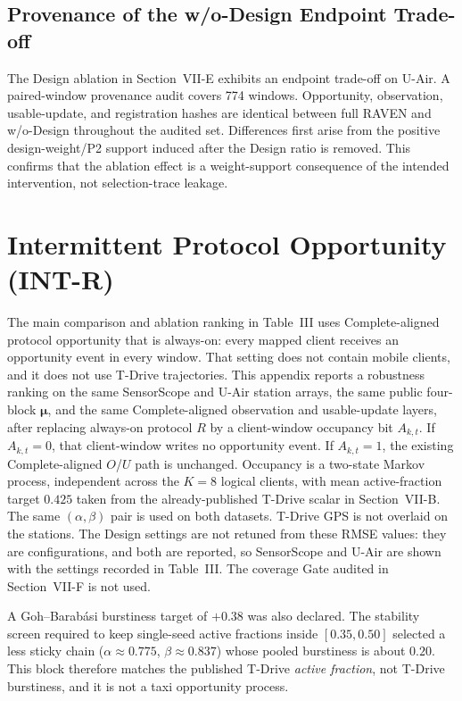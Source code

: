 \subsection{Provenance of the w/o-Design Endpoint Trade-off}
\label{app:design_provenance}

The Design ablation in Section~\mbox {VII-E} exhibits an endpoint
trade-off on U-Air.  A paired-window provenance audit covers
774 windows.  Opportunity, observation, usable-update, and
registration hashes are identical between full RAVEN and w/o-Design throughout
the audited set.  Differences first arise from the positive design-weight/P2
support induced after the Design ratio is removed.  This confirms that the
ablation effect is a weight-support consequence of the intended intervention,
not selection-trace leakage.

\section{Intermittent Protocol Opportunity (INT-R)}
\label{app:int_r}

The main comparison and ablation ranking in Table~III uses
Complete-aligned protocol opportunity that is always-on: every mapped
client receives an opportunity event in every window.  That setting does
not contain mobile clients, and it does not use T-Drive trajectories.
This appendix reports a robustness ranking on the same SensorScope and
U-Air station arrays, the same public four-block $\boldsymbol\mu$, and the
same Complete-aligned observation and usable-update layers, after replacing
always-on protocol $R$ by a client-window occupancy bit $A_{k,t}$.
If $A_{k,t}=0$, that client-window writes no opportunity event.  If
$A_{k,t}=1$, the existing Complete-aligned $O$/$U$ path is unchanged.
Occupancy is a two-state Markov process, independent across the $K=8$
logical clients, with mean active-fraction target $0.425$ taken from the
already-published T-Drive scalar in Section~\mbox {VII-B}.  The
same $(\alpha,\beta)$ pair is used on both datasets.  T-Drive GPS is not
overlaid on the stations.  The Design settings are not retuned from
these RMSE values: they are configurations, and both are reported, so
SensorScope and U-Air are shown with the settings recorded in Table~III.
The coverage Gate audited in Section~\mbox {VII-F} is not used.

A Goh--Barab\'asi burstiness target of $+0.38$ was also declared.  The
stability screen required to keep single-seed active fractions inside
$[0.35,0.50]$ selected a less sticky chain
($\alpha\approx0.775$, $\beta\approx0.837$) whose pooled burstiness is
about $0.20$.  This block therefore matches the published T-Drive
\emph{active fraction}, not T-Drive burstiness, and it is not a taxi
opportunity process.

